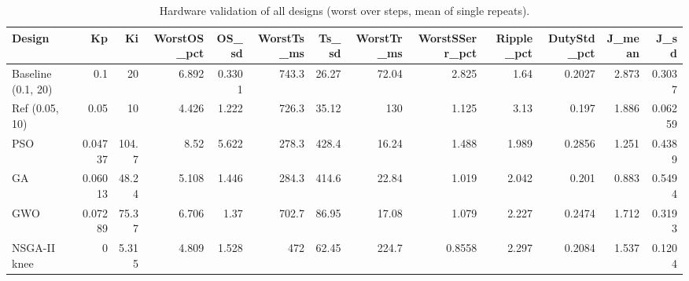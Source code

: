 \begin{table}[t]
\centering\caption{Hardware validation of all designs (worst over steps, mean of single repeats).}\label{tab:hwval}
\begin{tabular}{lrrrrrrrrrrrr}
\toprule
Design & Kp & Ki & WorstOS\_pct & OS\_sd & WorstTs\_ms & Ts\_sd & WorstTr\_ms & WorstSSerr\_pct & Ripple\_pct & DutyStd\_pct & J\_mean & J\_sd \\
\midrule
Baseline (0.1, 20) & 0.1 & 20 & 6.892 & 0.3301 & 743.3 & 26.27 & 72.04 & 2.825 & 1.64 & 0.2027 & 2.873 & 0.3037 \\
Ref (0.05, 10) & 0.05 & 10 & 4.426 & 1.222 & 726.3 & 35.12 & 130 & 1.125 & 3.13 & 0.197 & 1.886 & 0.06259 \\
PSO & 0.04737 & 104.7 & 8.52 & 5.622 & 278.3 & 428.4 & 16.24 & 1.488 & 1.989 & 0.2856 & 1.251 & 0.4389 \\
GA & 0.06013 & 48.24 & 5.108 & 1.446 & 284.3 & 414.6 & 22.84 & 1.019 & 2.042 & 0.201 & 0.883 & 0.5494 \\
GWO & 0.07289 & 75.37 & 6.706 & 1.37 & 702.7 & 86.95 & 17.08 & 1.079 & 2.227 & 0.2474 & 1.712 & 0.3193 \\
NSGA-II knee & 0 & 5.315 & 4.809 & 1.528 & 472 & 62.45 & 224.7 & 0.8558 & 2.297 & 0.2084 & 1.537 & 0.1204 \\
\bottomrule
\end{tabular}
\end{table}
